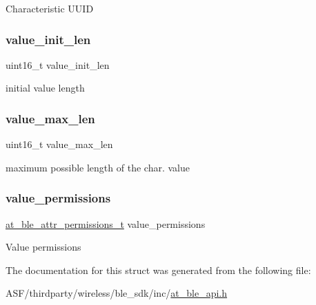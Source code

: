 Characteristic U\+U\+ID \mbox{\label{structat__ble__characteristic__t_a1bdee23606d013941b6df78daad85fcb}} 
\subsubsection{\texorpdfstring{value\_init\_len}{value\_init\_len}}
{\footnotesize\ttfamily uint16\+\_\+t value\+\_\+init\+\_\+len}

initial value length \mbox{\label{structat__ble__characteristic__t_aa72b9c8715f94b93b1eb97309917821f}} 
\subsubsection{\texorpdfstring{value\_max\_len}{value\_max\_len}}
{\footnotesize\ttfamily uint16\+\_\+t value\+\_\+max\+\_\+len}

maximum possible length of the char. value \mbox{\label{structat__ble__characteristic__t_a7973bc0ef3b3e4a8860f82b22e515ffb}} 
\subsubsection{\texorpdfstring{value\_permissions}{value\_permissions}}
{\footnotesize\ttfamily \mbox{\hyperlink{at__ble__api_8h_a5d87cd231ea3f9e11846dba7cf75eb61}{at\+\_\+ble\+\_\+attr\+\_\+permissions\+\_\+t}} value\+\_\+permissions}

Value permissions 

The documentation for this struct was generated from the following file\+:\begin{DoxyCompactItemize}
\item 
A\+S\+F/thirdparty/wireless/ble\+\_\+sdk/inc/\mbox{\hyperlink{at__ble__api_8h}{at\+\_\+ble\+\_\+api.\+h}}\end{DoxyCompactItemize}
